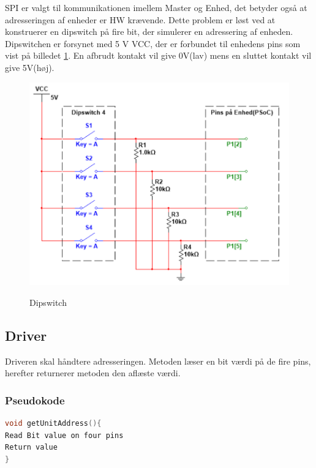 SPI er valgt til kommunikationen imellem Master og Enhed, det betyder også at adresseringen af enheder er HW krævende. Dette problem er løst ved at konstruerer en dipswitch på fire bit, der simulerer en adressering af enheden. Dipswitchen er forsynet med 5 V VCC, der er forbundet til enhedens pins som vist på billedet \ref{lab:Dipswitch}. En afbrudt kontakt vil give 0V(lav) mens en sluttet kontakt vil give 5V(høj).  

\begin{figure}[H] \centering
{\includegraphics[width=\textwidth]{filer/design/billeder/dipswitch}}
\caption{Dipswitch}
\label{lab:Dipswitch}
\raggedright
\end{figure} 

\subsection{Driver}

Driveren skal håndtere adresseringen. Metoden læser en bit værdi på de fire pins, herefter returnerer metoden den aflæste værdi.  


\subsubsection*{Pseudokode}

\begin{lstlisting}[language=C]
void getUnitAddress(){
Read Bit value on four pins 
Return value
}
\end{lstlisting}